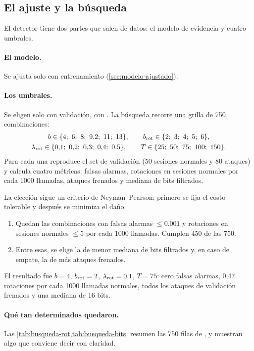 \subsection{El ajuste y la búsqueda}\label{sec:congelamiento}

El detector tiene dos partes que salen de datos: el modelo de evidencia y cuatro umbrales.

\paragraph{El modelo.} Se ajusta solo con entrenamiento (\cref{sec:modelo-ajustado}).

\paragraph{Los umbrales.} Se eligen solo con validación, con . La búsqueda
recorre una grilla de 750 combinaciones:
\begin{gather*}
  b \in \{4;\ 6;\ 8;\ 9{,}2;\ 11;\ 13\}, \qquad
  b_{\mathrm{rot}} \in \{2;\ 3;\ 4;\ 5;\ 6\}, \\
  \lambda_{\mathrm{rot}} \in \{0{,}1;\ 0{,}2;\ 0{,}3;\ 0{,}4;\ 0{,}5\}, \qquad
  T \in \{25;\ 50;\ 75;\ 100;\ 150\} .
\end{gather*}
Para cada una reproduce el set de validación (50 sesiones normales y 80 ataques) y calcula cuatro
métricas: falsas alarmas, rotaciones en sesiones normales por cada \num{1000} llamadas, ataques
frenados y mediana de bits filtrados.

La elección sigue un criterio de Neyman--Pearson: primero se fija el costo tolerable y después se
minimiza el daño.

\begin{enumerate}
  \item Quedan las combinaciones con falsas alarmas $\leq \num{0.001}$ y rotaciones en sesiones
    normales $\leq 5$ por cada \num{1000} llamadas. Cumplen 450 de las 750.
  \item Entre esas, se elige la de menor mediana de bits filtrados y, en caso de empate, la de más
    ataques frenados.
\end{enumerate}

El resultado fue $b = 4$, $b_{\mathrm{rot}} = 2$, $\lambda_{\mathrm{rot}} = \num{0.1}$, $T = 75$: cero falsas alarmas, 0,47
rotaciones por cada \num{1000} llamadas normales, todos los ataques de validación frenados y una
mediana de 16 bits.

\paragraph{Qué tan determinados quedaron.} Las \cref{tab:busqueda-rot,tab:busqueda-bits} resumen las
750 filas de , y muestran algo que conviene decir con claridad.

